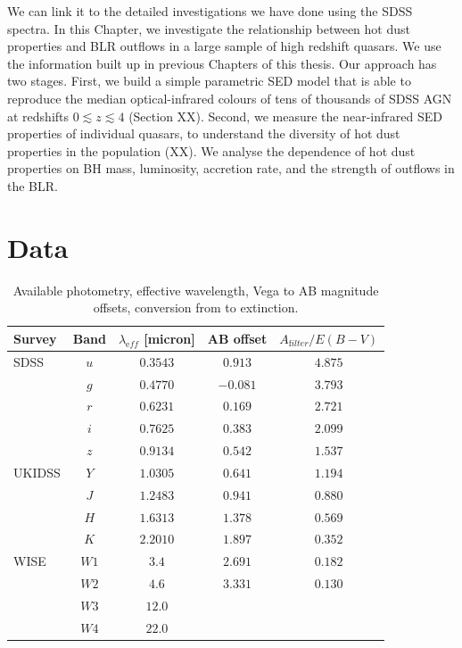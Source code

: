 We can link it to the detailed investigations we have done using the SDSS spectra. 
In this Chapter, we investigate the relationship between hot dust properties and BLR outflows in a large sample of high redshift quasars. 
We use the information built up in previous Chapters of this thesis. 
Our approach has two stages. 
First, we build a simple parametric SED model that is able to reproduce the median optical-infrared colours of tens of thousands of SDSS AGN at redshifts $0 \lesssim z \lesssim 4$ (Section XX). 
Second, we measure the near-infrared SED properties of individual quasars, to understand the diversity of hot dust properties in the population (XX).
We analyse the dependence of hot dust properties on BH mass, luminosity, accretion rate, and the strength of outflows in the BLR. 

\section{Data}

\begin{table}
  \footnotesize
  \centering
  \begin{tabular}{lcccc}
    \hline 
    Survey & Band & $\lambda_{\mathrm eff}$ [micron] & AB offset & $A_{\mathrm filter}/E(B-V)$ \\
    \hline 
    SDSS & $u$ & $0.3543$ & $ 0.913$ & $4.875$ \\
         & $g$ & $0.4770$ & $-0.081$ & $3.793$ \\
         & $r$ & $0.6231$ & $ 0.169$ & $2.721$ \\
         & $i$ & $0.7625$ & $ 0.383$ & $2.099$ \\
         & $z$ & $0.9134$ & $ 0.542$ & $1.537$ \\
    UKIDSS & $Y$ & $1.0305$ &  $0.641$ & $1.194$ \\
           & $J$ & $1.2483$ &  $0.941$ & $0.880$ \\
           & $H$ & $1.6313$ &  $1.378$ & $0.569$ \\
           & $K$ & $2.2010$ &  $1.897$ & $0.352$ \\
    WISE & $W1$ & $3.4$ & $2.691$ & $0.182$\\
         & $W2$ & $4.6$ & $3.331$ & $0.130$\\
         & $W3$ & $12.0$ & & \\
         & $W4$ & $22.0$ & & \\           
    \hline
  \end{tabular}
  \caption[{Available photometry, effective wavelength, Vega to AB magnitude offsets, conversion from \ebv to extinction.}]{Available photometry, effective wavelength, Vega to AB magnitude offsets, conversion from \ebv to extinction. }
  \label{tab:photometry}
\end{table}

